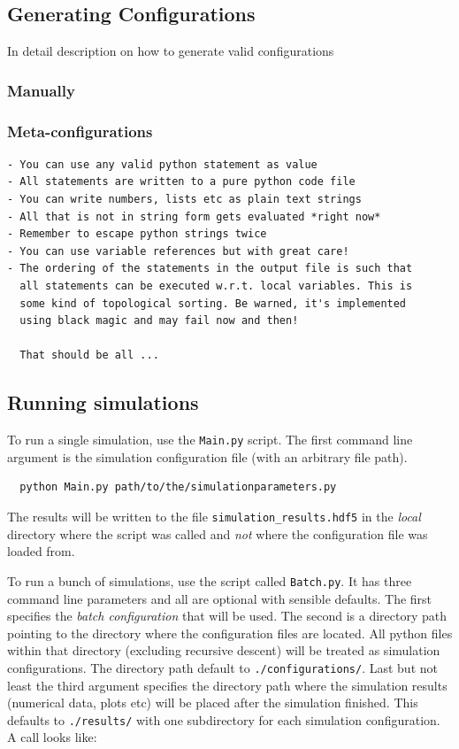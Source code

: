 \documentclass[a4paper,10pt]{report}
\begin{document}
\subsection{Generating Configurations}

In detail description on how to generate valid configurations

\subsubsection{Manually}

\subsubsection{Meta-configurations}

\begin{verbatim}
- You can use any valid python statement as value
- All statements are written to a pure python code file
- You can write numbers, lists etc as plain text strings
- All that is not in string form gets evaluated *right now*
- Remember to escape python strings twice
- You can use variable references but with great care!
- The ordering of the statements in the output file is such that
  all statements can be executed w.r.t. local variables. This is
  some kind of topological sorting. Be warned, it's implemented
  using black magic and may fail now and then!

  That should be all ...
\end{verbatim}

\subsection{Running simulations}

To run a single simulation, use the \texttt{Main.py} script. The first command
line argument is the simulation configuration file (with an arbitrary file path).

\begin{verbatim}
  python Main.py path/to/the/simulationparameters.py
\end{verbatim}

The results will be written to the file \texttt{simulation\_results.hdf5}
in the \emph{local} directory where the script was called and \emph{not}
where the configuration file was loaded from.

To run a bunch of simulations, use the script called \texttt{Batch.py}. It
has three command line parameters and all are optional with sensible defaults.
The first specifies the \emph{batch configuration} that will be used. The second
is a directory path pointing to the directory where the configuration files
are located. All python files within that directory (excluding recursive descent)
will be treated as simulation configurations. The directory path default to
\texttt{./configurations/}. Last but not least the third argument specifies the
directory path where the simulation results (numerical data, plots etc) will be
placed after the simulation finished. This defaults to \texttt{./results/}
with one subdirectory for each simulation configuration. A call looks like:
\end{document}
